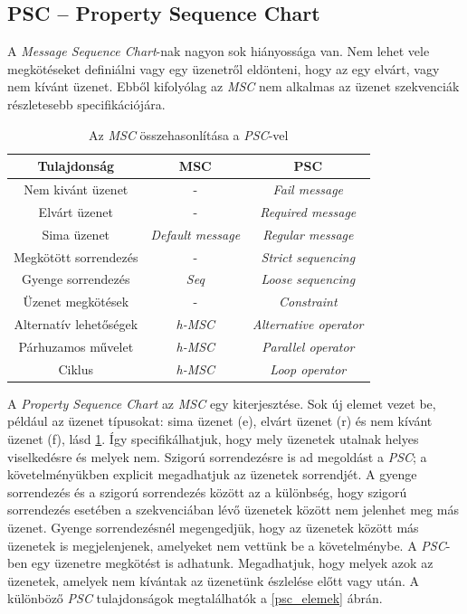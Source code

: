 \subsection{PSC – Property Sequence Chart}
A \textit{Message Sequence Chart}-nak nagyon sok hiányossága van.
Nem lehet vele megkötéseket definiálni vagy egy üzenetről eldönteni, hogy az egy elvárt, vagy nem kívánt üzenet.
Ebből kifolyólag az \textit{MSC} nem alkalmas az üzenet szekvenciák részletesebb specifikációjára.

\begin{table}[ht]
    \centering %
    \begin{tabular}{ |c|c|c| } %
    \hline
    \textbf{Tulajdonság} & \textbf{MSC} & \textbf{PSC} \\ [0.5ex] %
    \hline %
    \hline
    Nem kivánt üzenet & - & \textit{Fail message} \\ %
    \hline
    Elvárt üzenet & - & \textit{Required message} \\
    \hline
    Sima üzenet & \textit{Default message} & \textit{Regular message} \\
    \hline
    Megkötött sorrendezés & - & \textit{Strict sequencing} \\
    \hline
    Gyenge sorrendezés & \textit{Seq} & \textit{Loose sequencing} \\
    \hline
    Üzenet megkötések & - & \textit{Constraint} \\
    \hline
    Alternatív lehetőségek & \textit{h-MSC} & \textit{Alternative operator} \\
    \hline
    Párhuzamos művelet & \textit{h-MSC} & \textit{Parallel operator} \\
    \hline
    Ciklus & \textit{h-MSC} & \textit{Loop operator} \\
    \hline %
    \end{tabular}
    \caption{Az \textit{MSC} összehasonlítása a \textit{PSC}-vel} %
    \label{psc_tablazat} %
\end{table}

A \textit{Property Sequence Chart} \cite{PSC1} az \textit{MSC} egy kiterjesztése.
Sok új elemet vezet be, például az üzenet típusokat: sima üzenet (e), elvárt üzenet (r) és nem kívánt üzenet (f), lásd \ref{psc_tablazat}.
Így specifikálhatjuk, hogy mely üzenetek utalnak helyes viselkedésre és melyek nem.
Szigorú sorrendezésre is ad megoldást a \textit{PSC}; a követelményükben explicit megadhatjuk az üzenetek sorrendjét.
A gyenge sorrendezés és a szigorú sorrendezés között az a különbség, hogy szigorú sorrendezés esetében a szekvenciában lévő üzenetek között nem jelenhet meg más üzenet.
Gyenge sorrendezésnél megengedjük, hogy az üzenetek között más üzenetek is megjelenjenek, amelyeket nem vettünk be a követelménybe.
A \textit{PSC}-ben egy üzenetre megkötést is adhatunk.
Megadhatjuk, hogy melyek azok az üzenetek, amelyek nem kívántak az üzenetünk észlelése előtt vagy után.
A különböző \textit{PSC} tulajdonságok megtalálhatók a \ref{psc_elemek} ábrán.

